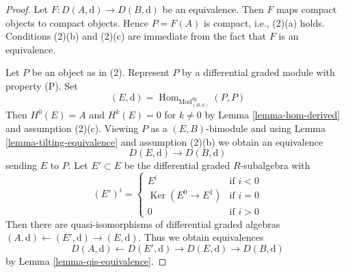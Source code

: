 \documentclass{amsart}
\theoremstyle{plain}
\theoremstyle{definition}
\theoremstyle{remark}
\numberwithin{equation}{subsection}
\def\Hom{\mathop{\mathrm{Hom}}\nolimits}
\def\Ker{\mathop{\mathrm{Ker}}}
\begin{document}
\begin{proof}
Let $F : D(A, \text{d}) \to D(B, \text{d})$ be an equivalence.
Then $F$ maps compact objects to compact objects. Hence $P = F(A)$ is
compact, i.e., (2)(a) holds. Conditions (2)(b) and (2)(c) are immediate
from the fact that $F$ is an equivalence.

\medskip\noindent
Let $P$ be an object as in (2). Represent $P$ by a
differential graded module with property (P). Set
$$
(E, \text{d}) = \Hom_{\text{Mod}^{dg}_{(B, \text{d})}}(P, P)
$$
Then $H^0(E) = A$ and $H^k(E) = 0$ for $k \not = 0$ by
Lemma \ref{lemma-hom-derived} and assumption (2)(c).
Viewing $P$ as a $(E, B)$-bimodule and using
Lemma \ref{lemma-tilting-equivalence} and assumption (2)(b)
we obtain an equivalence
$$
D(E, \text{d}) \to D(B, \text{d})
$$
sending $E$ to $P$.
Let $E' \subset E$ be the differential graded $R$-subalgebra
with
$$
(E')^i = \left\{
\begin{matrix}
E^i & \text{if }i < 0 \\
\Ker(E^0 \to E^1) & \text{if }i = 0 \\
0 & \text{if }i > 0
\end{matrix}
\right.
$$
Then there are quasi-isomorphisms of differential graded
algebras $(A, \text{d}) \leftarrow (E', \text{d}) \rightarrow (E, \text{d})$.
Thus we obtain equivalences
$$
D(A, \text{d}) \leftarrow D(E', \text{d}) \rightarrow D(E, \text{d})
\rightarrow D(B, \text{d})
$$
by Lemma \ref{lemma-qis-equivalence}.
\end{proof}
\end{document}

